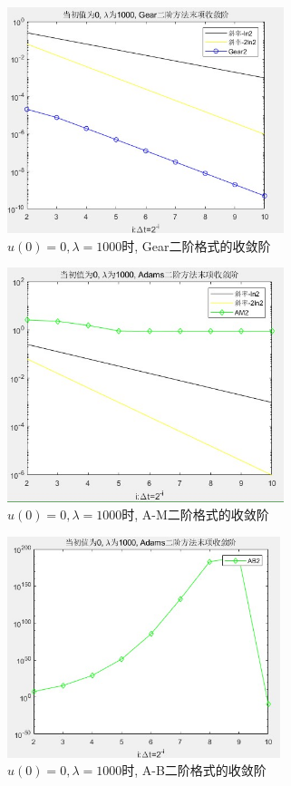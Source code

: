 \documentclass[12pt]{article}
\begin{document}
\begin{figure}[H]
	\centering
	\includegraphics[width=0.72\textwidth]{22}
	\caption{$u(0)=0, \lambda=1000$时, Gear二阶格式的收敛阶}
\end{figure}
\begin{figure}[H]
	\centering
	\includegraphics[width=0.72\textwidth]{23}
	\caption{$u(0)=0, \lambda=1000$时, A-M二阶格式的收敛阶}
\end{figure}
\begin{figure}[H]
	\centering
	\includegraphics[width=0.71\textwidth]{24}
	\caption{$u(0)=0, \lambda=1000$时, A-B二阶格式的收敛阶}
\end{figure}
\end{document}

